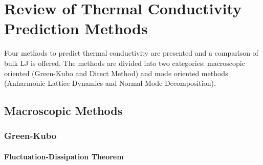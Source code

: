 \chapter{Review of Thermal Conductivity Prediction Methods}

Four methods to predict thermal conductivity are presented and a comparison of bulk LJ is offered. The methods are divided into two categories: macroscopic oriented (Green-Kubo and Direct Method) and mode oriented methods (Anharmonic Lattice Dynamics and Normal Mode Decomposition).

\section{Macroscopic Methods}
\subsection{Green-Kubo}
\subsubsection{Fluctuation-Dissipation Theorem}

